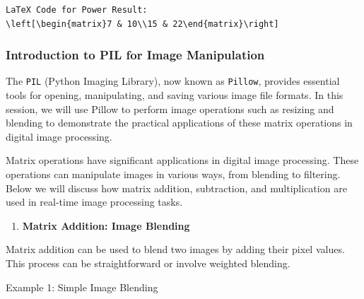 \documentclass[
  letterpaper,
  DIV=11,
  numbers=noendperiod]{scrreprt}
\providecommand{\tightlist}{%
  \setlength{\itemsep}{0pt}\setlength{\parskip}{0pt}}\usepackage{longtable,booktabs,array}
\theoremstyle{plain}
\theoremstyle{definition}
\theoremstyle{remark}
\begin{document}
\begin{verbatim}
LaTeX Code for Power Result:
\left[\begin{matrix}7 & 10\\15 & 22\end{matrix}\right]
\end{verbatim}

\subsubsection{Introduction to PIL for Image
Manipulation}\label{introduction-to-pil-for-image-manipulation}

The \texttt{PIL} (Python Imaging Library), now known as \texttt{Pillow},
provides essential tools for opening, manipulating, and saving various
image file formats. In this session, we will use Pillow to perform image
operations such as resizing and blending to demonstrate the practical
applications of these matrix operations in digital image processing.

Matrix operations have significant applications in digital image
processing. These operations can manipulate images in various ways, from
blending to filtering. Below we will discuss how matrix addition,
subtraction, and multiplication are used in real-time image processing
tasks.

\begin{enumerate}
\def\labelenumi{\arabic{enumi}.}
\tightlist
\item
  \textbf{Matrix Addition: Image Blending}
\end{enumerate}

Matrix addition can be used to blend two images by adding their pixel
values. This process can be straightforward or involve weighted
blending.

Example 1: Simple Image Blending
\end{document}
